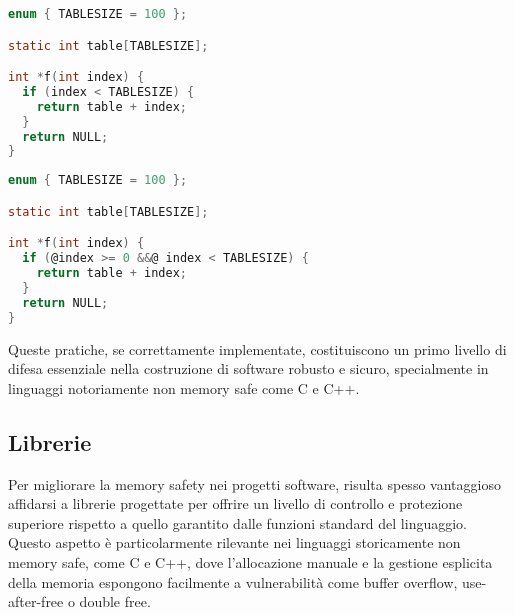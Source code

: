 \begin{minipage}[t]{0.4\textwidth}
  \begin{lstlisting}[language=C, caption={Codice \textit{Non-Compliant}}, label={lst:non-compliant}]
enum { TABLESIZE = 100 };

static int table[TABLESIZE];

int *f(int index) {
  if (index < TABLESIZE) {
    return table + index;
  }
  return NULL;
}
\end{lstlisting}
\end{minipage}
\hfill
\begin{minipage}[t]{0.5\textwidth}
  \begin{lstlisting}[language=C, caption={Codice \textit{Compliant}}, label={lst:compliant}, style=changes_in_c]
enum { TABLESIZE = 100 };

static int table[TABLESIZE];

int *f(int index) {
  if (@index >= 0 &&@ index < TABLESIZE) {
    return table + index;
  }
  return NULL;
}
\end{lstlisting}
\end{minipage}

\medskip
\noindent
Queste pratiche, se correttamente implementate, costituiscono un primo livello
di difesa essenziale nella costruzione di software robusto e sicuro, specialmente
in linguaggi notoriamente non memory safe come C e C++.

\subsection{Librerie}
\label{sec:librerie}

Per migliorare la memory safety nei progetti software, risulta spesso vantaggioso
affidarsi a librerie progettate per offrire un livello di controllo e protezione
superiore rispetto a quello garantito dalle funzioni standard del linguaggio.
Questo aspetto è particolarmente rilevante nei linguaggi storicamente non memory
safe, come C e C++, dove l'allocazione manuale e la gestione esplicita della
memoria espongono facilmente a vulnerabilità come buffer overflow, use-after-free
o double free.

